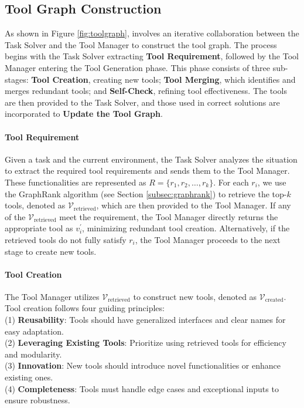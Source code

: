 \subsection{Tool Graph Construction}
As shown in Figure \ref{fig:toolgraph}, \ours involves an iterative collaboration between the Task Solver and the Tool Manager to construct the tool graph. The process begins with the Task Solver extracting \textbf{Tool Requirement}, followed by the Tool Manager entering the Tool Generation phase. This phase consists of three sub-stages: \textbf{Tool Creation}, creating new tools; \textbf{Tool Merging}, which identifies and merges redundant tools; and \textbf{Self-Check}, refining tool effectiveness. The tools are then provided to the Task Solver, and those used in correct solutions are incorporated to \textbf{Update the Tool Graph}.
\vspace{-5pt}
\paragraph{Tool Requirement} Given a task and the current environment, the Task Solver analyzes the situation to extract the required tool requirements and sends them to the Tool Manager. These functionalities are represented as $R = \{r_1, r_2, \dots, r_k\}$. 
For each $r_i$, we use the GraphRank algorithm (see Section \ref{subsec:graphrank}) to retrieve the top-$k$ tools, denoted as $\mathcal{V}_{\text{retrieved}}$, which are then provided to the Tool Manager. 
If any of the $\mathcal{V}_{\text{retrieved}}$ meet the requirement, the Tool Manager directly returns the appropriate tool as $v_i^{\prime}$, minimizing redundant tool creation. Alternatively, if the retrieved tools do not fully satisfy $r_i$, the Tool Manager proceeds to the next stage to create new tools.
\vspace{-5pt}
\paragraph{Tool Creation} The Tool Manager utilizes $\mathcal{V}_{\text{retrieved}}$ to construct new tools, denoted as $\mathcal{V}_{\text{created}}$. Tool creation follows four guiding principles:
 \\
(1) \textbf{Reusability}: Tools should have generalized interfaces and clear names for easy adaptation. \\
(2) \textbf{Leveraging Existing Tools}: Prioritize using retrieved tools for efficiency and modularity. \\
(3) \textbf{Innovation}: New tools should introduce novel functionalities or enhance existing ones. \\
(4) \textbf{Completeness}: Tools must handle edge cases and exceptional inputs to ensure robustness.
\vspace{-5pt}
